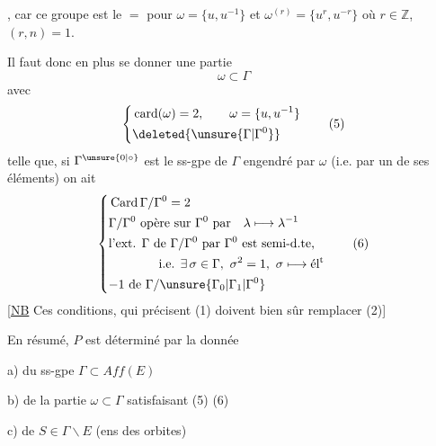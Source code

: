 , car ce groupe est le $=$ pour 
$\omega=\{u,u^{-1}\}$ et $\omega^{(r)}=\{u^r,u^{-r}\}$ où $r\in\mathbb Z$, $(r,n)=1$.

Il faut donc en plus se donner une
partie
\[
\omega\subset\Gamma\tag*{(4)}
\]
avec
\[
\left\{\begin{aligned}
&\operatorname{card}(\omega)=2,\qquad\omega=\{u,u^{-1}\}\\
&\deleted{\unsure{\Gamma|\Gamma^0}}
\end{aligned}\right.\tag*{(5)}
\]
 telle que, si $\Gamma^{\unsure{0|\circ}}$ est le ss-gpe de $\Gamma$
engendré par $\omega$ (i.e. par un \uline{} 
de ses éléments) on ait
\[
\left\{\begin{aligned}
&\operatorname{Card}\Gamma/\Gamma^0=2\\
&\Gamma/\Gamma^0\ \text{opère sur }\Gamma^0\ \text{par}\quad\lambda\longmapsto\lambda^{-1}\\
&\text{l'ext. }\Gamma\ \text{de }\Gamma/\Gamma^0\ \text{par }\Gamma^0\ \text{est semi-d.te,}\\
&\hspace{4em}\text{i.e. }\exists\,\sigma\in\Gamma,\ \sigma^2=1,\ \sigma\longmapsto\text{él\textsuperscript{t}}
\\&\hfill {-1}\ \text{de }\Gamma/\unsure{\Gamma_0|\Gamma_1|\Gamma^0}
\end{aligned}\right.\tag*{(6)}
\]
[\uline{NB} Ces conditions, qui précisent (1) 
doivent bien sûr remplacer (2)]

En résumé, $P$ est déterminé
par la donnée

a) du ss-gpe $\Gamma\subset\mathit{Aff}(E)$

b) de la partie $\omega\subset\Gamma$
satisfaisant (5) (6)

c) de $S\in\Gamma\backslash E$ (ens des orbites)

